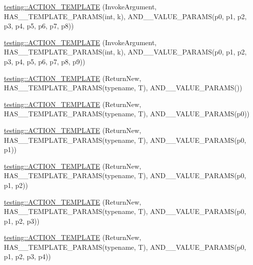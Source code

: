\begin{DoxyCompactItemize}
\item 
\mbox{\hyperlink{namespacetesting_a910551adbfeb1854071ef55ae54a5c0f}{testing\+::\+A\+C\+T\+I\+O\+N\+\_\+\+T\+E\+M\+P\+L\+A\+TE}} (Invoke\+Argument, H\+A\+S\+\_\+\_\+\+T\+E\+M\+P\+L\+A\+T\+E\+\_\+\+P\+A\+R\+A\+MS(int, k), A\+N\+D\+\_\+\_\+\+V\+A\+L\+U\+E\+\_\+\+P\+A\+R\+A\+MS(p0, p1, p2, p3, p4, p5, p6, p7, p8))
\item 
\mbox{\hyperlink{namespacetesting_ab7bf885ff274cbdc09f19c39e43b7f2b}{testing\+::\+A\+C\+T\+I\+O\+N\+\_\+\+T\+E\+M\+P\+L\+A\+TE}} (Invoke\+Argument, H\+A\+S\+\_\+\_\+\+T\+E\+M\+P\+L\+A\+T\+E\+\_\+\+P\+A\+R\+A\+MS(int, k), A\+N\+D\+\_\+\_\+\+V\+A\+L\+U\+E\+\_\+\+P\+A\+R\+A\+MS(p0, p1, p2, p3, p4, p5, p6, p7, p8, p9))
\item 
\mbox{\hyperlink{namespacetesting_a468e601467d018ab7566f321d3f7e871}{testing\+::\+A\+C\+T\+I\+O\+N\+\_\+\+T\+E\+M\+P\+L\+A\+TE}} (Return\+New, H\+A\+S\+\_\+\_\+\+T\+E\+M\+P\+L\+A\+T\+E\+\_\+\+P\+A\+R\+A\+MS(typename, T), A\+N\+D\+\_\+\_\+\+V\+A\+L\+U\+E\+\_\+\+P\+A\+R\+A\+MS())
\item 
\mbox{\hyperlink{namespacetesting_af07e911d69b8efb03bddbd0332f79ba0}{testing\+::\+A\+C\+T\+I\+O\+N\+\_\+\+T\+E\+M\+P\+L\+A\+TE}} (Return\+New, H\+A\+S\+\_\+\_\+\+T\+E\+M\+P\+L\+A\+T\+E\+\_\+\+P\+A\+R\+A\+MS(typename, T), A\+N\+D\+\_\+\_\+\+V\+A\+L\+U\+E\+\_\+\+P\+A\+R\+A\+MS(p0))
\item 
\mbox{\hyperlink{namespacetesting_ad418620ed637e789f91d029f4fe85b4b}{testing\+::\+A\+C\+T\+I\+O\+N\+\_\+\+T\+E\+M\+P\+L\+A\+TE}} (Return\+New, H\+A\+S\+\_\+\_\+\+T\+E\+M\+P\+L\+A\+T\+E\+\_\+\+P\+A\+R\+A\+MS(typename, T), A\+N\+D\+\_\+\_\+\+V\+A\+L\+U\+E\+\_\+\+P\+A\+R\+A\+MS(p0, p1))
\item 
\mbox{\hyperlink{namespacetesting_ac24511eb64ebe2c2927feaf285ac3785}{testing\+::\+A\+C\+T\+I\+O\+N\+\_\+\+T\+E\+M\+P\+L\+A\+TE}} (Return\+New, H\+A\+S\+\_\+\_\+\+T\+E\+M\+P\+L\+A\+T\+E\+\_\+\+P\+A\+R\+A\+MS(typename, T), A\+N\+D\+\_\+\_\+\+V\+A\+L\+U\+E\+\_\+\+P\+A\+R\+A\+MS(p0, p1, p2))
\item 
\mbox{\hyperlink{namespacetesting_afc5a3710d11bdee2023d8402b84d86ed}{testing\+::\+A\+C\+T\+I\+O\+N\+\_\+\+T\+E\+M\+P\+L\+A\+TE}} (Return\+New, H\+A\+S\+\_\+\_\+\+T\+E\+M\+P\+L\+A\+T\+E\+\_\+\+P\+A\+R\+A\+MS(typename, T), A\+N\+D\+\_\+\_\+\+V\+A\+L\+U\+E\+\_\+\+P\+A\+R\+A\+MS(p0, p1, p2, p3))
\item 
\mbox{\hyperlink{namespacetesting_a0c03444379adfb849db243829946c1ed}{testing\+::\+A\+C\+T\+I\+O\+N\+\_\+\+T\+E\+M\+P\+L\+A\+TE}} (Return\+New, H\+A\+S\+\_\+\_\+\+T\+E\+M\+P\+L\+A\+T\+E\+\_\+\+P\+A\+R\+A\+MS(typename, T), A\+N\+D\+\_\+\_\+\+V\+A\+L\+U\+E\+\_\+\+P\+A\+R\+A\+MS(p0, p1, p2, p3, p4))

\end{DoxyCompactItemize}
